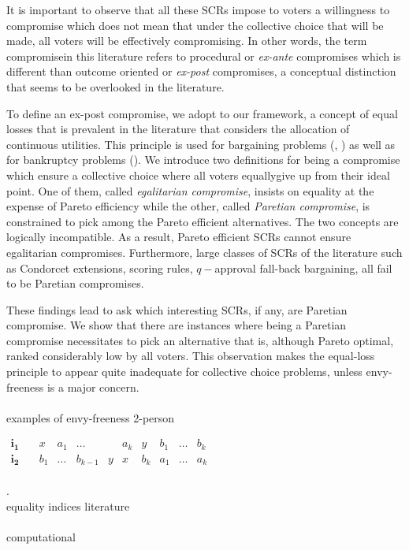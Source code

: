 \documentclass[version=3.21, pagesize, twoside=off, bibliography=totoc, DIV=calc, fontsize=12pt, a4paper]{scrartcl}
\begin{document}
It is important to observe that all these SCRs impose to voters a willingness to compromise which does not mean that under the collective choice that will be made, all voters will be effectively compromising. In other words, the term \oquot compromise\cquot in this literature refers to procedural or \textit{ex-ante} compromises which is different than outcome oriented or \textit{ex-post} compromises, a conceptual distinction that seems to be overlooked in the literature.

To define an ex-post compromise, we adopt to our framework, a concept of equal losses that is prevalent in the literature that considers the allocation of continuous utilities. This principle is used for bargaining problems (\cite{Chun1988}, \cite{Chun1991}) as well as for bankruptcy problems (\cite{Herrero2001}).
We introduce two definitions for being a compromise which ensure a collective choice where all voters \oquot equally\cquot give up from their ideal point. One of them, called \textit{egalitarian compromise}, insists on equality at the expense of Pareto efficiency while the other, called \textit{Paretian compromise}, is constrained to pick among the Pareto efficient alternatives. The two concepts are logically incompatible. As a result, Pareto efficient SCRs cannot ensure egalitarian compromises. Furthermore, large classes of SCRs of the literature such as Condorcet extensions, scoring rules, $q-$approval fall-back bargaining, all fail to be Paretian compromises.

These findings lead to ask which interesting SCRs, if any, are Paretian compromise. We show that there are instances where being a Paretian compromise necessitates to pick an alternative that is, although Pareto optimal, ranked considerably low by all voters. This observation makes the equal-loss principle to appear quite inadequate for collective choice problems, unless envy-freeness is a major concern.
\\ \\
examples of envy-freeness 2-person
\begin{example}
	\begin{center}
		$
		\begin{array}{cccccccccc}
		\mathbf{i_1} \quad &x&a_1&\dots&&a_k&y&b_1&\dots&b_k\\
		\mathbf{i_2} \quad &b_1&\dots&b_{k-1}&y&x&b_k&a_1&\dots&a_k\\
		\end{array}
		$
	\end{center}
\end{example}
.\\
equality indices literature
\\ \\
computational
\end{document}
